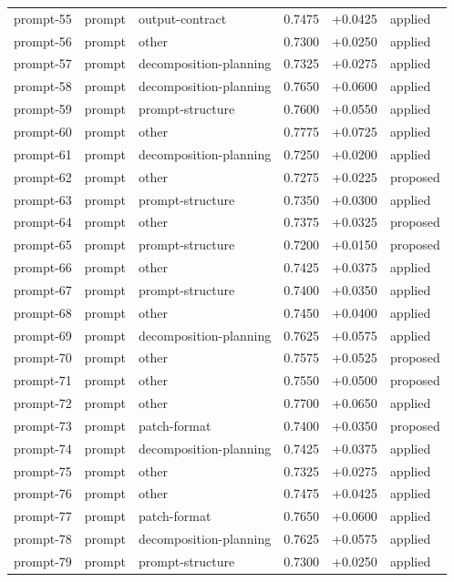 \begin{center}
\begin{longtable}{llp{5.2cm}rrl}
prompt-55 & prompt & output-contract & 0.7475 & +0.0425 & applied \\
prompt-56 & prompt & other & 0.7300 & +0.0250 & applied \\
prompt-57 & prompt & decomposition-planning & 0.7325 & +0.0275 & applied \\
prompt-58 & prompt & decomposition-planning & 0.7650 & +0.0600 & applied \\
prompt-59 & prompt & prompt-structure & 0.7600 & +0.0550 & applied \\
prompt-60 & prompt & other & 0.7775 & +0.0725 & applied \\
prompt-61 & prompt & decomposition-planning & 0.7250 & +0.0200 & applied \\
prompt-62 & prompt & other & 0.7275 & +0.0225 & proposed \\
prompt-63 & prompt & prompt-structure & 0.7350 & +0.0300 & applied \\
prompt-64 & prompt & other & 0.7375 & +0.0325 & proposed \\
prompt-65 & prompt & prompt-structure & 0.7200 & +0.0150 & proposed \\
prompt-66 & prompt & other & 0.7425 & +0.0375 & applied \\
prompt-67 & prompt & prompt-structure & 0.7400 & +0.0350 & applied \\
prompt-68 & prompt & other & 0.7450 & +0.0400 & applied \\
prompt-69 & prompt & decomposition-planning & 0.7625 & +0.0575 & applied \\
prompt-70 & prompt & other & 0.7575 & +0.0525 & proposed \\
prompt-71 & prompt & other & 0.7550 & +0.0500 & proposed \\
prompt-72 & prompt & other & 0.7700 & +0.0650 & applied \\
prompt-73 & prompt & patch-format & 0.7400 & +0.0350 & proposed \\
prompt-74 & prompt & decomposition-planning & 0.7425 & +0.0375 & applied \\
prompt-75 & prompt & other & 0.7325 & +0.0275 & applied \\
prompt-76 & prompt & other & 0.7475 & +0.0425 & applied \\
prompt-77 & prompt & patch-format & 0.7650 & +0.0600 & applied \\
prompt-78 & prompt & decomposition-planning & 0.7625 & +0.0575 & applied \\
prompt-79 & prompt & prompt-structure & 0.7300 & +0.0250 & applied \\

\end{longtable}
\end{center}
